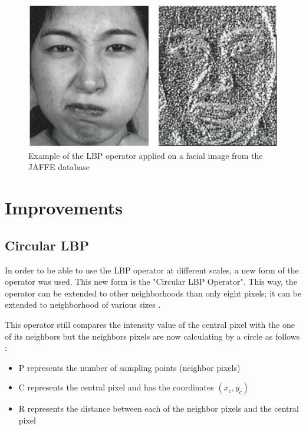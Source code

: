 \begin{figure}[!h]
\begin{center}
\noindent \includegraphics[scale=0.5]{figures/lbp_basic_operator_example} 
\newline
\caption{Example of the LBP operator applied on a facial image from the JAFFE database}
\label{lbp_basic_operator_example}
\end{center} 
\end{figure}

\section{Improvements}

\subsection{Circular LBP}

\vspace{\baselineskip}
\noindent In order to be able to use the LBP operator at different scales, a new form of the operator was used. This new form is the "Circular LBP Operator". This way, the operator can be extended to other neighborhoods than only eight pixels; it can be extended to neighborhood of various sizes \cite{GAN08}.
\newline

\noindent This operator still compares the intensity value of the central pixel with the one of its neighbors but the neighbors pixels are now calculating by a circle as follows \cite{GAN08}:

\begin{itemize}
  \item P represents the number of sampling points (neighbor pixels)
  \item C represents the central pixel and has the coordinates $ (x_c,y_c) $
  \item R represents the distance between each of the neighbor pixels and the central pixel
\end{itemize}

